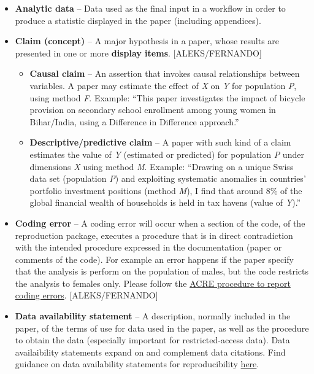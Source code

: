 \documentclass[]{book}
\providecommand{\tightlist}{%
  \setlength{\itemsep}{0pt}\setlength{\parskip}{0pt}}
\begin{document}
\begin{itemize}
\tightlist
\item
  \textbf{Analytic data} -- Data used as the final input in a workflow in order to produce a statistic displayed in the paper (including appendices).\\
\item
  \textbf{Claim (concept)} -- A major hypothesis in a paper, whose results are presented in one or more \textbf{display items}. {[}ALEKS/FERNANDO{]}

  \begin{itemize}
  \tightlist
  \item
    \textbf{Causal claim} -- An assertion that invokes causal relationships between variables. A paper may estimate the effect of \emph{X} on \emph{Y} for population \emph{P}, using method \emph{F}. Example: ``This paper investigates the impact of bicycle provision on secondary school enrollment among young women in Bihar/India, using a Difference in Difference approach.''\\
  \item
    \textbf{Descriptive/predictive claim} -- A paper with such kind of a claim estimates the value of \emph{Y} (estimated or predicted) for population \emph{P} under dimensions \emph{X} using method \emph{M}. Example: ``Drawing on a unique Swiss data set (population \emph{P}) and exploiting systematic anomalies in countries' portfolio investment positions (method \emph{M}), I find that around 8\% of the global financial wealth of households is held in tax havens (value of \emph{Y}).''\\
  \end{itemize}
\item
  \textbf{Coding error} -- A coding error will occur when a section of the code, of the reproduction package, executes a procedure that is in direct contradiction with the intended procedure expressed in the documentation (paper or comments of the code). For example an error happens if the paper specify that the analysis is perform on the population of males, but the code restricts the analysis to females only. Please follow the \href{ADD\%20LINK}{ACRE procedure to report coding errors}. {[}ALEKS/FERNANDO{]}
\item
  \textbf{Data availability statement} -- A description, normally included in the paper, of the terms of use for data used in the paper, as well as the procedure to obtain the data (especially important for restricted-access data). Data availaibility statements expand on and complement data citations. Find guidance on data availability statements for reproducibility \href{https://social-science-data-editors.github.io/guidance/Requested_information_dcas.html\#what-are-data-and-code-availability-statements-dcas}{here}.\\

\end{itemize}
\end{document}
